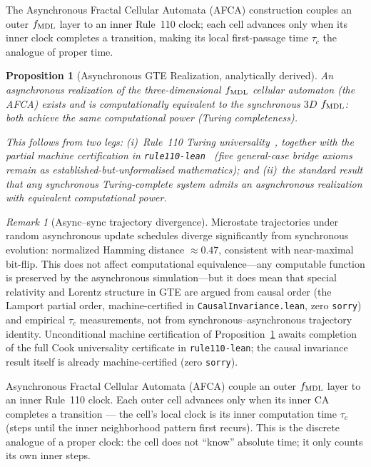 \documentclass[11pt]{article}
\newtheorem{proposition}[theorem]{Proposition}
\theoremstyle{remark}
\newtheorem{remark}[theorem]{Remark}
\newcommand{\lean}[1]{%
  \penalty-100
  \begingroup\def\_{\textunderscore\allowbreak}\texttt{#1}\endgroup}
\newcommand{\CatAD}{analytically derived}
\newcommand{\fmdl}{f_{\rm MDL}}
\begin{document}
The Asynchronous Fractal Cellular Automata (AFCA) construction couples an outer $f_{\rm MDL}$ layer to an inner Rule~110 clock; each cell advances only when its inner clock completes a transition, making its local first-passage time $\tau_c$ the analogue of proper time.

\begin{proposition}[Asynchronous GTE Realization, \CatAD]\label{prop:async_equiv}
An asynchronous realization of the three-dimensional $f_{\rm MDL}$ cellular
automaton (the AFCA) exists and is computationally equivalent to the synchronous
$3D$ $f_{\rm MDL}$: both achieve the same computational power (Turing completeness).

This follows from two legs: (i)~Rule~110 Turing universality~\cite{Cook2004},
together with the partial machine certification in
\texttt{rule110-lean}~\cite{rule110-lean} (five general-case bridge axioms remain
as established-but-unformalised mathematics); and (ii)~the standard result that
any synchronous Turing-complete system admits an asynchronous realization with
equivalent computational power.
\end{proposition}

\begin{remark}[Async--sync trajectory divergence]
Microstate trajectories under random asynchronous update schedules diverge
significantly from synchronous evolution: normalized Hamming distance $\approx 0.47$,
consistent with near-maximal bit-flip.
This does not affect computational equivalence---any computable function is
preserved by the asynchronous simulation---but it does mean that special
relativity and Lorentz structure in GTE are argued from causal order (the
Lamport partial order, machine-certified in \lean{CausalInvariance.lean},
zero \texttt{sorry}) and empirical $\tau_c$ measurements, not from
synchronous--asynchronous trajectory identity.
Unconditional machine certification of Proposition~\ref{prop:async_equiv} awaits
completion of the full Cook universality certificate in \texttt{rule110-lean};
the causal invariance result itself is already machine-certified (zero \texttt{sorry}).
\end{remark}

Asynchronous Fractal Cellular Automata (AFCA) couple an outer $\fmdl$ layer
to an inner Rule~110 clock.
Each outer cell advances only when its inner CA completes a transition ---
the cell's local clock is its inner computation time $\tau_c$
(steps until the inner neighborhood pattern first recurs).
This is the discrete analogue of a proper clock: the cell does not
``know'' absolute time; it only counts its own inner steps.
\end{document}
